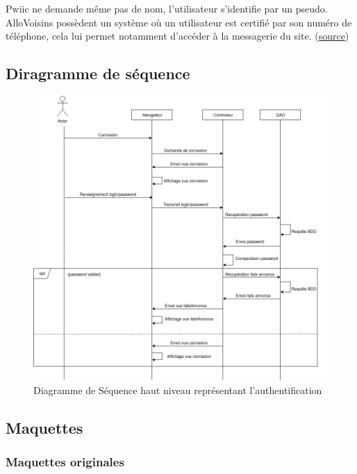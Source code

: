 \documentclass[a4paper,11pt]{article}
\begin{document}
Pwiic ne demande même pas de nom, l’utilisateur s’identifie par un pseudo.\\

AlloVoisins possèdent un système où un utilisateur est certifié par son numéro de téléphone,
cela lui permet notamment d’accéder à la messagerie du site. (\href{https://support.allovoisins.com/hc/fr/articles/360000816614-Pourquoi-dois-je-certifier-mon-num%C3%A9ro-de-mobile-pour-pouvoir-acc%C3%A9der-%C3%A0-la-messagerie-}{source})

\subsection{Diragramme de séquence}

\begin{figure}[H]
  \includegraphics[width=\linewidth]{../Conception/DS_Connexion.png}
  \caption{Diagramme de Séquence haut niveau représentant l'authentification}
  \label{fig:ds-connexion}
\end{figure}

\subsection{Maquettes}
\label{sec:maquettes-annexe}

\subsubsection{Maquettes originales}
\end{document}
